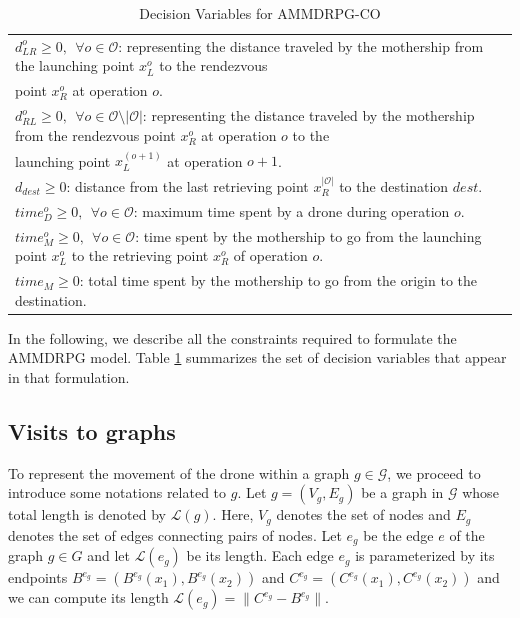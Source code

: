 \documentclass[10pt,a4paper]{elsarticle}
\def\AMD{{\sf AMMDRPG\xspace}}
\newcommand{\EN}[1]{{\color{black}#1}}
\begin{document}
\begin{table}[h!]
\begin{tabular}{|l|}
	$d_{LR}^o \geq 0, \:\: \forall o \in \mathcal O$: representing the distance traveled by the mothership from the launching point $x_L^o$ to the rendezvous\\
	\hspace*{1cm}   point $x_R^o$ at operation $o$.\\
	$d_{RL}^o \geq 0, \:\: \forall o \in \mathcal O\setminus |\mathcal O|$: representing the distance traveled by the mothership from the rendezvous point $x_R^o$ at operation $o$ to the \\ 
	\hspace*{1cm}  launching point $x_L^{(o+1)}$ at operation $o+1$.\\
	$d_{dest}\geq 0$: distance from the last retrieving point $x_R^{|\mathcal O|}$ to the destination $dest$.\\
	
	$time_D^o \geq 0, \:\: \forall o \in \mathcal O$: maximum time spent by a drone during operation $o$.\\
	$time_M^o \geq 0, \:\: \forall o \in \mathcal O$: time spent by the mothership to go from the launching point $x_L^o$ to the retrieving point $x_R^o$ of operation $o$.\\
	$time_M \geq 0$: total time spent by the mothership to go from the origin to the destination.\\
	\hline
\end{tabular}
\caption{Decision Variables for AMMDRPG-CO}
\label{table:t2}
\end{table}

\noindent
In the following, we describe all the constraints required to formulate the \AMD\xspace model. Table \ref{table:t2} summarizes the set of decision variables that appear in that formulation.
\subsection*{Visits \EN{to} graphs}
\noindent
To represent the movement of the drone within a graph $g\in\mathcal G$, we proceed to introduce some notation\EN{s} related to $g$.
Let $g = (V_g, E_g)$ be a graph in $\mathcal G$ whose total length is denoted by $\mathcal L(g)$. Here, $V_g$ denotes the set of nodes and $E_g$ denotes the set of edges connecting pairs of nodes.  Let $e_g$ be the edge $e$ of the graph $g \in G$ and let $\mathcal  L(e_g)$ be its length. Each edge $e_g$ is parameterized by its endpoints $B^{e_g}= (B^{e_g}(x_1), B^{e_g}(x_2))$ and $C^{e_g}= (C^{e_g}(x_1), C^{e_g}(x_2))$ and we can compute its length $\mathcal L(e_g) =\|C^{e_g} -  B^{e_g}\|$. 
\end{document}
